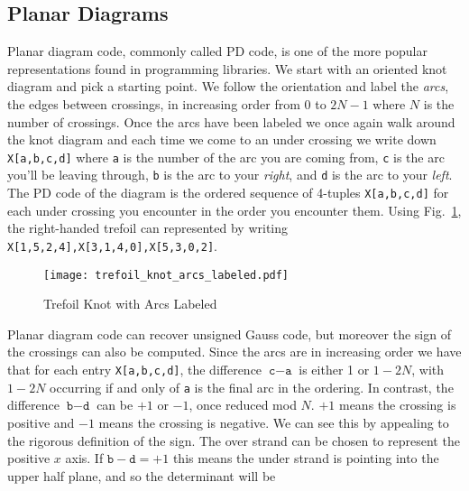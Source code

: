     \subsection{Planar Diagrams}
        Planar diagram code, commonly called PD code, is one of the more popular
        representations found in programming libraries. We start with an
        oriented knot diagram and pick a starting point. We follow the
        orientation and label the \textit{arcs}, the edges between crossings,
        in increasing order from $0$ to $2N-1$ where $N$ is the number of
        crossings. Once the arcs have been labeled we once again walk around
        the knot diagram and each time we come to an under crossing we write
        down \texttt{X[a,b,c,d]} where \texttt{a} is the number of the arc you
        are coming from, \texttt{c} is the arc you'll be leaving through,
        \texttt{b} is the arc to your \textit{right}, and \texttt{d} is the
        arc to your \textit{left}. The PD code of the diagram is the ordered
        sequence of 4-tuples \texttt{X[a,b,c,d]} for each under crossing you
        encounter in the order you encounter them. Using
        Fig.~\ref{fig:trefoil_knot_arcs_labeled}, the right-handed trefoil can
        represented by writing \texttt{X[1,5,2,4],X[3,1,4,0],X[5,3,0,2]}.
        \begin{figure}
            \centering
            \texttt{[image: trefoil\_knot\_arcs\_labeled.pdf]}
            \caption{Trefoil Knot with Arcs Labeled}
            \label{fig:trefoil_knot_arcs_labeled}
        \end{figure}
        \par\hfill\par
        Planar diagram code can recover unsigned Gauss code, but moreover
        the sign of the crossings can also be computed. Since the arcs are in
        increasing order we have that for each entry \texttt{X[a,b,c,d]},
        the difference $\texttt{c}-\texttt{a}$ is either 1 or $1-2N$,
        with $1-2N$ occurring if and only of \texttt{a} is the final
        arc in the ordering. In contrast, the difference $\texttt{b}-\texttt{d}$
        can be $+1$ or $-1$, once reduced mod $N$. $+1$ means the crossing is
        positive and $-1$ means the crossing is negative. We can see this by
        appealing to the rigorous definition of the sign. The over strand can
        be chosen to represent the positive $x$ axis. If
        $\texttt{b}-\texttt{d}=+1$ this means the under strand is pointing
        into the upper half plane, and so the determinant will be
